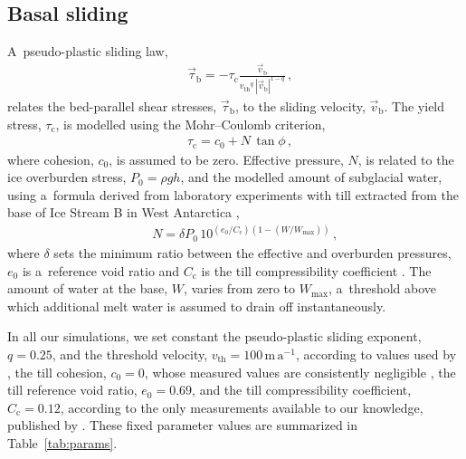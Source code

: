 \documentclass{article}
\newcommand{\unit}[1]{\ensuremath{\mathrm{#1}}}
\begin{document}
\subsection{Basal sliding}
\label{sec:sliding}

      A~pseudo-plastic sliding law,
%
\begin{align}
&\label{eqn:pseudoplastic}
    \vec{\tau}_{\mathrm{b}} = -\tau_{\mathrm{c}} \frac{\vec{v}_{\mathrm{b}}}{{v_{\text{th}}}^q\,|\vec{v}_{\mathrm{b}}|^{1-q}} \,,
\end{align}
%
      relates the bed-parallel shear stresses, $\vec{\tau}_{\mathrm{b}}$, to
      the sliding velocity, $\vec{v}_{\mathrm{b}}$.
      The yield stress, $\tau_{\mathrm{c}}$, is modelled using the
      Mohr--Coulomb criterion,
%
\begin{align}
&\tau_{\mathrm{c}} = c_0 + N\,\tan{\phi} \,,
\end{align}
%
      where cohesion, $c_0$, is assumed to be zero. Effective pressure, $N$,
      is related to the ice overburden stress, $P_0=\rho gh$, and the
      modelled amount of
      subglacial water, using a~formula derived from laboratory experiments
      with till extracted from the base of Ice Stream B in West Antarctica
      \citep{Tulaczyk.etal.2000, Bueler.Pelt.2015},
%
\begin{align}
&\label{eqn:ntil}
&N = \delta P_0 \, 10^{(e_0/C_{\mathrm{c}}) (1 - (W/W_{\text{max}}))} \,,
\end{align}
%
      where $\delta$ sets the minimum ratio between the effective and
      overburden pressures, $e_0$ is a~reference void ratio and
      $C_{\mathrm{c}}$ is the till compressibility coefficient
      \citep{Tulaczyk.etal.2000}. The amount of water at the base, $W$,
      varies from zero to $W_{\text{max}}$, a~threshold above which
      additional melt water is assumed to drain off instantaneously.

      In all our simulations, we set constant the pseudo-plastic sliding
      exponent, $q=0.25$, and the threshold velocity,
      $v_{\text{th}}=100$\,\unit{m\,a^{-1}}, according to values used by
      \citet{Aschwanden.etal.2013}, the till cohesion, $c_0=0$, whose
      measured values are consistently negligible
      \citep[p.~268]{Tulaczyk.etal.2000, Cuffey.Paterson.2010}, the till
      reference void ratio, $e_0=0.69$, and the till compressibility
      coefficient, $C_{\mathrm{c}}=0.12$, according to the only measurements
      available to our knowledge, published by \citet{Tulaczyk.etal.2000}.
      These fixed parameter values are summarized in Table~\ref{tab:params}.
\end{document}
